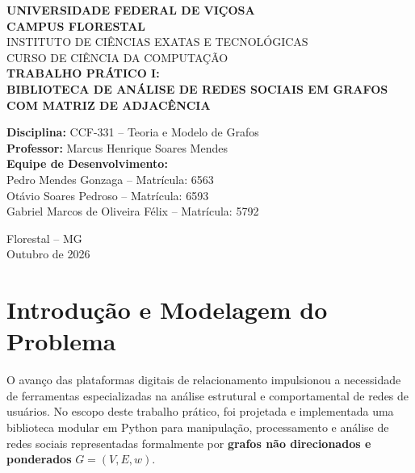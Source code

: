 \documentclass[12pt,a4paper]{article}
\begin{document}
\begin{titlepage}
    \centering
    {\large \textbf{UNIVERSIDADE FEDERAL DE VIÇOSA}}\\[0.2cm]
    {\large \textbf{CAMPUS FLORESTAL}}\\[0.2cm]
    {\large INSTITUTO DE CIÊNCIAS EXATAS E TECNOLÓGICAS}\\[0.2cm]
    {\large CURSO DE CIÊNCIA DA COMPUTAÇÃO}\\[3.5cm]

    {\bfseries \Large TRABALHO PRÁTICO I:}\\[0.3cm]
    {\bfseries \LARGE BIBLIOTECA DE ANÁLISE DE REDES SOCIAIS EM GRAFOS COM MATRIZ DE ADJACÊNCIA}\\[3.5cm]

    \begin{flushleft}
        \textbf{Disciplina:} CCF-331 -- Teoria e Modelo de Grafos\\
        \textbf{Professor:} Marcus Henrique Soares Mendes\\[0.8cm]
        \textbf{Equipe de Desenvolvimento:}\\
        Pedro Mendes Gonzaga -- Matrícula: 6563\\
        Otávio Soares Pedroso -- Matrícula: 6593\\
        Gabriel Marcos de Oliveira Félix -- Matrícula: 5792
    \end{flushleft}

    \vfill
    {\large Florestal -- MG}\\
    {\large Outubro de 2026}
\end{titlepage}

\tableofcontents
\newpage

\section{Introdução e Modelagem do Problema}

O avanço das plataformas digitais de relacionamento impulsionou a necessidade de ferramentas especializadas na análise estrutural e comportamental de redes de usuários. No escopo deste trabalho prático, foi projetada e implementada uma biblioteca modular em Python para manipulação, processamento e análise de redes sociais representadas formalmente por \textbf{grafos não direcionados e ponderados} $G = (V, E, w)$.
\end{document}
